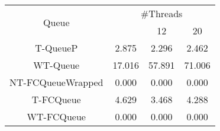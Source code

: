 \begin{tabular}{|c|c|c|c|}
\hline
\multirow{2}{*}{Queue} & \multicolumn{3}{c|}{\#Threads}\\\cline{2-4}& \quad 4 & 12 & 20\\
\hline
\hline
T-QueueP & 2.875 & 2.296 & 2.462\\
WT-Queue & 17.016 & 57.891 & 71.006\\
NT-FCQueueWrapped & 0.000 & 0.000 & 0.000\\
T-FCQueue & 4.629 & 3.468 & 4.288\\
WT-FCQueue & 0.000 & 0.000 & 0.000\\
\hline\end{tabular}
